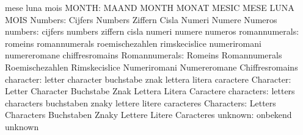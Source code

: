                                   mese                             luna
                                  mois
                           MONTH: MAAND                            MONTH
                                  MONAT                            MESIC
                                  MESE                             LUNA
                                  MOIS
                         Numbers: Cijfers                          Numbers
                                  Ziffern                          Cisla
                                  Numeri                           Numere
                                  Numeros
                         numbers: cijfers                          numbers
                                  ziffern                          cisla
                                  numeri                           numere
                                  numeros
                   romannumerals: romeins                          romannumerals
                                  roemischezahlen                  rimskecislice
                                  numeriromani                     numereromane
                                  chiffresromains
                   Romannumerals: Romeins                          Romannumerals
                                  Roemischezahlen                  Rimskecislice
                                  Numeriromani                     Numereromane
                                  Chiffresromains
                       character: letter                           character
                                  buchstabe                        znak
                                  lettera                          litera
                                  caractere
                       Character: Letter                           Character
                                  Buchstabe                        Znak
                                  Lettera                          Litera
                                  Caractere
                      characters: letters                          characters
                                  buchstaben                       znaky
                                  lettere                          litere
                                  caracteres
                      Characters: Letters                          Characters
                                  Buchstaben                       Znaky
                                  Lettere                          Litere
                                  Caracteres
                         unknown: onbekend                         unknown
